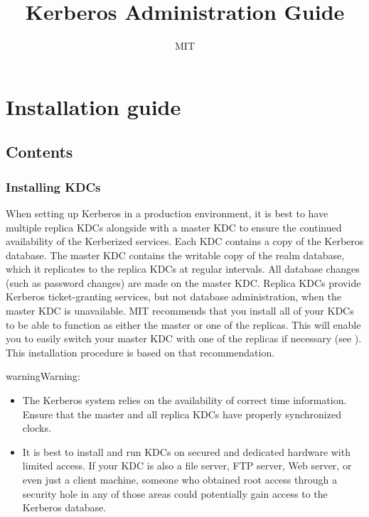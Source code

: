 \documentclass[letterpaper,10pt,english]{sphinxmanual}
\title{Kerberos Administration Guide}
\date{ }
\author{MIT}
\begin{document}
\maketitle
\sphinxtableofcontents
{}\label{\detokenize{admin/index::doc}}



\chapter{Installation guide}
\label{\detokenize{admin/install:for-administrators}}\label{\detokenize{admin/install::doc}}\label{\detokenize{admin/install:installation-guide}}

\section{Contents}
\label{\detokenize{admin/install:contents}}

\subsection{Installing KDCs}
\label{\detokenize{admin/install_kdc:installing-kdcs}}\label{\detokenize{admin/install_kdc::doc}}
When setting up Kerberos in a production environment, it is best to
have multiple replica KDCs alongside with a master KDC to ensure the
continued availability of the Kerberized services.  Each KDC contains
a copy of the Kerberos database.  The master KDC contains the writable
copy of the realm database, which it replicates to the replica KDCs at
regular intervals.  All database changes (such as password changes)
are made on the master KDC.  Replica KDCs provide Kerberos
ticket-granting services, but not database administration, when the
master KDC is unavailable.  MIT recommends that you install all of
your KDCs to be able to function as either the master or one of the
replicas.  This will enable you to easily switch your master KDC with
one of the replicas if necessary (see {\hyperref[\detokenize{admin/install_kdc:switch-master-replica}]{}}).
This installation procedure is based on that recommendation.

\begin{sphinxadmonition}{warning}{Warning:}\begin{itemize}
\item {} 
The Kerberos system relies on the availability of correct time
information.  Ensure that the master and all replica KDCs have
properly synchronized clocks.

\item {} 
It is best to install and run KDCs on secured and dedicated
hardware with limited access.  If your KDC is also a file
server, FTP server, Web server, or even just a client machine,
someone who obtained root access through a security hole in any
of those areas could potentially gain access to the Kerberos
database.

\end{itemize}
\end{sphinxadmonition}
\end{document}
